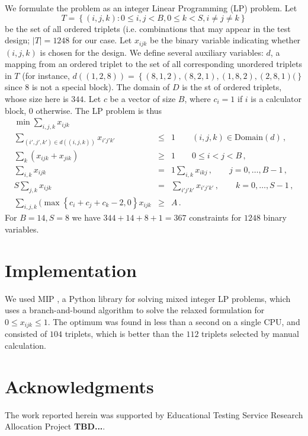 \documentclass{article}
\begin{document}
We formulate the problem as an integer Linear Programming (LP) problem. Let
\begin{equation}
	T = \left\{ (i, j, k) : 0 \leq i, j < B, 0 \leq k < S, i \not = j \not = k \right \}
\end{equation}
be the set of all ordered triplets (i.e. combinations that may appear in the test design; $|T|=1248$ for our case.  Let $x_{ijk}$ be the binary variable indicating whether $(i,j,k)$ is chosen for the design. We define several auxiliary variables: $d$, a mapping from an ordered triplet to the set of all corresponding unordered triplets in $T$ (for instance, $d((1,2,8)) = \left\{ (8,1,2), (8,2,1), (1,8,2), (2,8,1) (\right\}$ since $8$ is not a special block). The domain of $D$ is the st of ordered triplets, whose size here is $344$. Let $c$ be a vector of size $B$, where $c_i=1$ if $i$ is a calculator block, $0$ otherwise.
The LP problem is thus
\begin{eqnarray}
	\min \sum_{i,j,k} x_{ijk} && \\
	\sum_{(i',j',k') \in d((i,j,k))} x_{i'j'k'} &\leq&1 \qquad (i,j,k) \in {\mbox{Domain}}(d)\,, \\
	\sum_k \left( x_{ijk} + x_{jik} \right) &\geq&1 \qquad 0 \leq i < j < B\,, \\
	\sum_{i,k} x_{ijk} &=&1 \sum_{i,k} x_{ikj}\,, \qquad j = 0,\dots,B-1\,, \\
	S \sum_{j,k} x_{ijk} &=& \sum_{i'j'k'} x_{i'j'k'}\,, \qquad k = 0,\dots,S-1\,, \\
	\sum_{i,j,k} (\max\left\{c_i + c_j + c_k - 2, 0\right\} x_{ijk} &\geq& A\,.
\end{eqnarray}
For $B = 14, S=8$ we have $344 + 14 + 8 + 1 = 367$ constraints for $1248$ binary variables.

\section{Implementation}
We used MIP \cite{mip}, a Python library for solving mixed integer LP problems, which uses a branch-and-bound algorithm to solve the relaxed formulation for $0 \leq x_{ijk} \leq 1$. The optimum was found in less than a second on a single CPU, and consisted of $104$ triplets, which is better than the $112$ triplets selected by manual calculation.

\section{Acknowledgments}
The work reported herein was supported by Educational Testing Service Research Allocation Project {\bf TBD...}.

%

\end{document}
